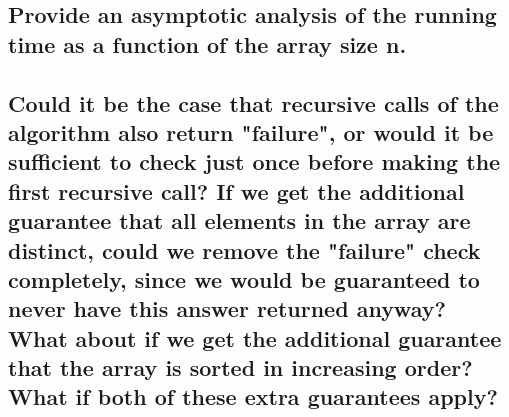 \documentclass[a4paper,12pt]{article}
\begin{document}
    
    
\subsection[]{Provide an asymptotic analysis of the running time as a function of the array size n.}
    
    

\subsection[]{Could it be the case that recursive calls of the algorithm also return "failure", or would it
be sufficient to check just once before making the first recursive call? If we get the additional
guarantee that all elements in the array are distinct, could we remove the "failure" check
completely, since we would be guaranteed to never have this answer returned anyway?
What about if we get the additional guarantee that the array is sorted in increasing order?
What if both of these extra guarantees apply?}
\end{document}
